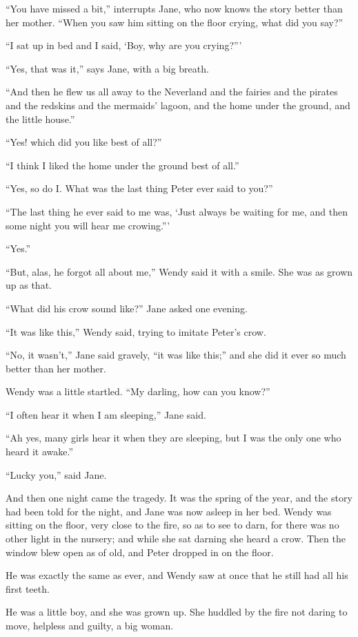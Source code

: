 ``You have missed a bit,'' interrupts Jane, who now knows the story
better than her mother. ``When you saw him sitting on the floor crying,
what did you say?''

``I sat up in bed and I said, ‘Boy, why are you crying?'''

``Yes, that was it,'' says Jane, with a big breath.

``And then he flew us all away to the Neverland and the fairies and the
pirates and the redskins and the mermaids' lagoon, and the home under
the ground, and the little house.''

``Yes! which did you like best of all?''

``I think I liked the home under the ground best of all.''

``Yes, so do I. What was the last thing Peter ever said to you?''

``The last thing he ever said to me was, ‘Just always be waiting for me,
and then some night you will hear me crowing.'''

``Yes.''

``But, alas, he forgot all about me,'' Wendy said it with a smile. She
was as grown up as that.

``What did his crow sound like?'' Jane asked one evening.

``It was like this,'' Wendy said, trying to imitate Peter's crow.

``No, it wasn't,'' Jane said gravely, ``it was like this;'' and she did it
ever so much better than her mother.

Wendy was a little startled. ``My darling, how can you know?''

``I often hear it when I am sleeping,'' Jane said.

``Ah yes, many girls hear it when they are sleeping, but I was the only
one who heard it awake.''

``Lucky you,'' said Jane.

And then one night came the tragedy. It was the spring of the year, and
the story had been told for the night, and Jane was now asleep in her
bed. Wendy was sitting on the floor, very close to the fire, so as to
see to darn, for there was no other light in the nursery; and while she
sat darning she heard a crow. Then the window blew open as of old, and
Peter dropped in on the floor.

He was exactly the same as ever, and Wendy saw at once that he still
had all his first teeth.

He was a little boy, and she was grown up. She huddled by the fire not
daring to move, helpless and guilty, a big woman.

